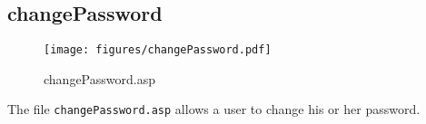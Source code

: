 \subsection{changePassword}
\begin{figure}[htb]
    \begin{center}
        \texttt{[image: figures/changePassword.pdf]}
    \end{center}
    \caption{changePassword.asp}
    \label{fig:changePassword}
\end{figure}

The file \verb|changePassword.asp| allows a user to change his or her password.
